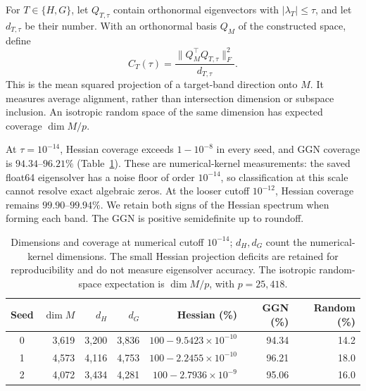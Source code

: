 For $T\in\{H,G\}$, let $Q_{T,\tau}$ contain orthonormal eigenvectors with $|\lambda_T|\le\tau$, and let $d_{T,\tau}$ be their number. With an orthonormal basis $Q_M$ of the constructed space, define
\[
 C_T(\tau)=\frac{\|Q_M^\top Q_{T,\tau}\|_F^2}{d_{T,\tau}}.
\]
This is the mean squared projection of a target-band direction onto $M$. It measures average alignment, rather than intersection dimension or subspace inclusion. An isotropic random space of the same dimension has expected coverage $\dim M/p$.

At $\tau=10^{-14}$, Hessian coverage exceeds $1-10^{-8}$ in every seed, and GGN coverage is $94.34$--$96.21\%$ (Table~\ref{tab:kernel-coverage-dimensions}). These are numerical-kernel measurements: the saved float64 eigensolver has a noise floor of order $10^{-14}$, so classification at this scale cannot resolve exact algebraic zeros. At the looser cutoff $10^{-12}$, Hessian coverage remains $99.90$--$99.94\%$. We retain both signs of the Hessian spectrum when forming each band. The GGN is positive semidefinite up to roundoff.

\begin{table}[!htbp]\centering
\caption{Dimensions and coverage at numerical cutoff $10^{-14}$; $d_H,d_G$ count the numerical-kernel dimensions. The small Hessian projection deficits are retained for reproducibility and do not measure eigensolver accuracy. The isotropic random-space expectation is $\dim M/p$, with $p=25{,}418$.}
\label{tab:kernel-coverage-dimensions}
\small\begin{tabular}{crrrrrr}\toprule
Seed & $\dim M$ & $d_H$ & $d_G$ & Hessian (\%) & GGN (\%) & Random (\%)\\\midrule
0 & 3,619 & 3,200 & 3,836 & $100-9.5423\!\times\!10^{-10}$ & 94.34 & 14.2\\
1 & 4,573 & 4,116 & 4,753 & $100-2.2455\!\times\!10^{-10}$ & 96.21 & 18.0\\
2 & 4,072 & 3,434 & 4,281 & $100-2.7936\!\times\!10^{-9}$ & 95.06 & 16.0\\
\bottomrule\end{tabular}
\end{table}

